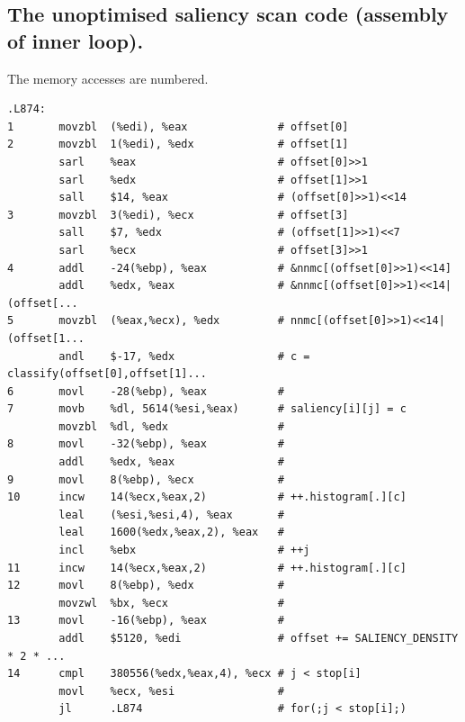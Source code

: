 \documentclass[pdftex,11pt,a4paper]{report}
\begin{document}
\begin{notesfornextyear}
\section{The unoptimised saliency scan code (assembly of inner loop).}
The memory accesses are numbered.
\lstset{language=[x86masm]Assembler}
\begin{lstlisting}
.L874:
1       movzbl  (%edi), %eax              # offset[0]
2       movzbl  1(%edi), %edx             # offset[1]
        sarl    %eax                      # offset[0]>>1
        sarl    %edx                      # offset[1]>>1
        sall    $14, %eax                 # (offset[0]>>1)<<14
3       movzbl  3(%edi), %ecx             # offset[3]
        sall    $7, %edx                  # (offset[1]>>1)<<7
        sarl    %ecx                      # offset[3]>>1
4       addl    -24(%ebp), %eax           # &nnmc[(offset[0]>>1)<<14]
        addl    %edx, %eax                # &nnmc[(offset[0]>>1)<<14|(offset[...
5       movzbl  (%eax,%ecx), %edx         # nnmc[(offset[0]>>1)<<14|(offset[1...
        andl    $-17, %edx                # c = classify(offset[0],offset[1]...
6       movl    -28(%ebp), %eax           #
7       movb    %dl, 5614(%esi,%eax)      # saliency[i][j] = c
        movzbl  %dl, %edx                 #
8       movl    -32(%ebp), %eax           #
        addl    %edx, %eax                #
9       movl    8(%ebp), %ecx             #
10      incw    14(%ecx,%eax,2)           # ++.histogram[.][c]
        leal    (%esi,%esi,4), %eax       #
        leal    1600(%edx,%eax,2), %eax   #
        incl    %ebx                      # ++j
11      incw    14(%ecx,%eax,2)           # ++.histogram[.][c]
12      movl    8(%ebp), %edx             #
        movzwl  %bx, %ecx                 #
13      movl    -16(%ebp), %eax           #
        addl    $5120, %edi               # offset += SALIENCY_DENSITY * 2 * ...
14      cmpl    380556(%edx,%eax,4), %ecx # j < stop[i]
        movl    %ecx, %esi                #
        jl      .L874                     # for(;j < stop[i];)
\end{lstlisting}

\end{notesfornextyear}
\end{document}
